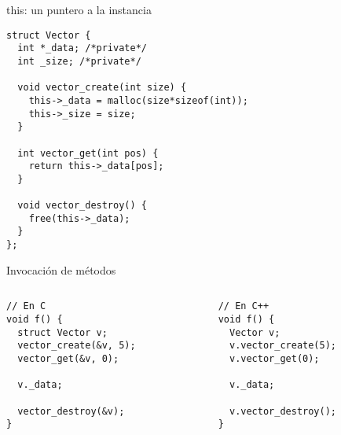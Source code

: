 \begin{frame}[fragile]{this: un puntero a la instancia}
        \begin{lstlisting}[style=normal,firstnumber=1,linebackgroundcolor={%
                 \btLstHLB<1>{5,10,14}%
         }]
struct Vector {
  int *_data; /*private*/
  int _size; /*private*/

  void vector_create(int size) {
    this->_data = malloc(size*sizeof(int));
    this->_size = size;
  }

  int vector_get(int pos) {
    return this->_data[pos];
  }

  void vector_destroy() {
    free(this->_data);
  }
};
        \end{lstlisting}
\end{frame}

\begin{frame}[fragile]{Invocaci\'on de m\'etodos}
   \begin{columns}[t]
      \begin{column}{.4\linewidth}
         \begin{lstlisting}[style=normal,firstnumber=14]
// En C
void f() {
  struct Vector v;
  vector_create(&v, 5);
  vector_get(&v, 0);

  v._data;

  vector_destroy(&v);
}
         \end{lstlisting}
     \end{column}
      \begin{column}{.4\linewidth}
        \begin{lstlisting}[style=normal,firstnumber=14]
// En C++
void f() {
  Vector v;
  v.vector_create(5);
  v.vector_get(0);

  v._data;

  v.vector_destroy();
}
        \end{lstlisting}
    \end{column}
\end{columns}
\end{frame}

